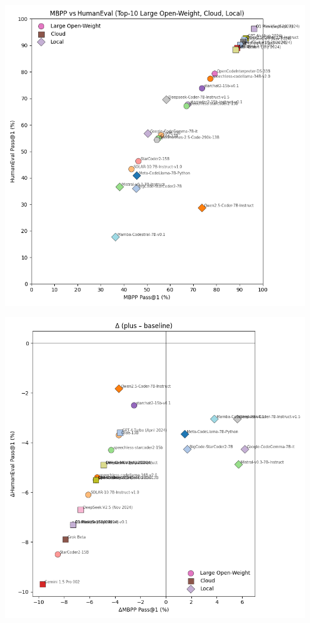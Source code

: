 \documentclass[a0,portrait,english]{hogent-poster}
\begin{document}
\begin{multicols}{2}
	\begin{center}
		\begin{minipage}[t]{0.48\linewidth}
			\centering
			\includegraphics[width=\linewidth]{graphics/scatter_mbpp_vs_humaneval.png}
			\label{fig:scatter-scores}
		\end{minipage}
		\hfill
		\begin{minipage}[t]{0.48\linewidth}
			\centering
			\includegraphics[width=\linewidth]{graphics/scatter_deltas_mbpp_vs_humaneval.png}
			\label{fig:scatter-deltas}
		\end{minipage}
	\end{center}


\end{multicols}
\end{document}
